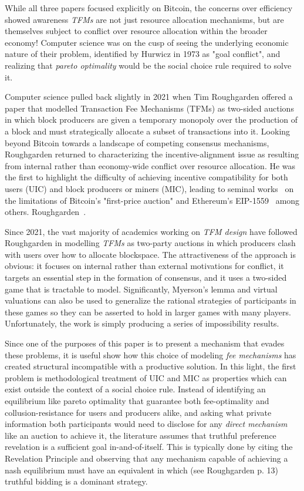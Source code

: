 \documentclass[sigconf,anonymous]{aamas}
\begin{document}
While all three papers focused explicitly on Bitcoin, the concerns over efficiency showed awareness \textit{TFMs} are not just resource allocation mechanisms, but are themselves subject to conflict over resource allocation within the broader economy! Computer science was on the cusp of seeing the underlying economic nature of their problem, identified by Hurwicz in 1973 as "goal conflict", and realizing that \textit{pareto optimality} would be the social choice rule required to solve it.

Computer science pulled back slightly in 2021 when Tim Roughgarden\citet{roughgarden2021,roughgarden2024transaction} offered a paper that modelled Transaction Fee Mechanisms (TFMs) as two-sided auctions in which block producers are given a temporary monopoly over the production of a block and must strategically allocate a subset of transactions into it. Looking beyond Bitcoin towards a landscape of competing consensus mechanisms, Roughgarden returned to characterizing the incentive-alignment issue as resulting from internal rather than economy-wide conflict over resource allocation. He was the first to highlight the difficulty of achieving incentive compatibility for both users (UIC) and block producers or miners (MIC), leading to seminal works~\cite {roughgarden2021,roughgarden2024transaction} on the limitations of Bitcoin's "first-price auction" and Ethereum's EIP-1559~\cite{buterin2019eip} among others. Roughgarden~\cite{roughgarden2021,roughgarden2024transaction}.

Since 2021, the vast majority of academics working on \textit{TFM design} have followed Roughgarden in modelling \textit{TFMs} as two-party auctions in which producers clash with users over how to allocate blockspace. The attractiveness of the approach is obvious: it focuses on internal rather than external motivations for conflict, it targets an essential step in the formation of consensus, and it uses a two-sided game that is tractable to model. Significantly, Myerson's lemma and virtual valuations can also be used to generalize the rational strategies of participants in these games so they can be asserted to hold in larger games with many players. Unfortunately, the work is simply producing a series of impossibility results.

Since one of the purposes of this paper is to present a mechanism that evades these problems, it is useful show how this choice of modeling \textit{fee mechanisms} has created structural incompatible with a productive solution. In this light, the first problem is methodological treatment of UIC and MIC as properties which can exist outside the context of a social choice rule. Instead of identifying an equilibrium like pareto optimality that guarantee both fee-optimality and collusion-resistance for users and producers alike, and asking what private information both participants would need to disclose for any \textit{direct mechanism} like an auction to achieve it, the literature assumes that truthful preference revelation is a sufficient goal in-and-of-itself. This is typically done by citing the Revelation Principle and observing that any mechanism capable of achieving a nash equilibrium must have an equivalent in which (see Roughgarden p. 13) truthful bidding is a dominant strategy.
\end{document}
